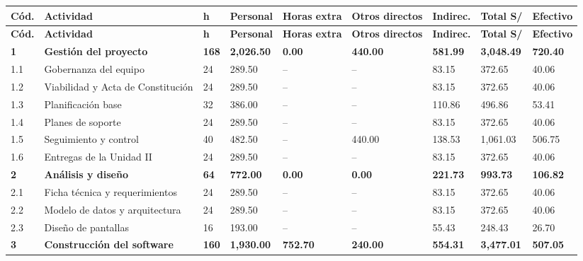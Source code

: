 \documentclass[11pt,a4paper]{article}
\begin{document}
\vspace{0.1cm}
{\footnotesize
\setlength{\tabcolsep}{3pt}
\begin{longtable}{@{}P{0.8cm} >{\raggedright\arraybackslash}p{3.65cm} Q{0.6cm} Q{1.45cm} Q{1.35cm} Q{1.45cm} Q{1.4cm} Q{1.65cm} Q{1.45cm}@{}}
\toprule
{}
\textbf{Cód.} & \textbf{Actividad} & \textbf{h} & \textbf{Personal} & \textbf{Horas extra} & \textbf{Otros directos} & \textbf{Indirec.} & \textbf{Total S/} & \textbf{Efectivo} \\
\midrule
\endfirsthead
\toprule
{}
\textbf{Cód.} & \textbf{Actividad} & \textbf{h} & \textbf{Personal} & \textbf{Horas extra} & \textbf{Otros directos} & \textbf{Indirec.} & \textbf{Total S/} & \textbf{Efectivo} \\
\midrule
\endhead
\bottomrule
\endfoot
{}
\textbf{1} & \textbf{\textcolor{Rama1}{Gestión del proyecto}} & \textbf{168} & \textbf{2,026.50} & \textbf{0.00} & \textbf{440.00} & \textbf{581.99} & \textbf{3,048.49} & \textbf{720.40} \\
1.1 & Gobernanza del equipo & 24 & 289.50 & -- & -- & 83.15 & 372.65 & 40.06 \\
1.2 & Viabilidad y Acta de Constitución & 24 & 289.50 & -- & -- & 83.15 & 372.65 & 40.06 \\
1.3 & Planificación base & 32 & 386.00 & -- & -- & 110.86 & 496.86 & 53.41 \\
1.4 & Planes de soporte & 24 & 289.50 & -- & -- & 83.15 & 372.65 & 40.06 \\
1.5 & Seguimiento y control & 40 & 482.50 & -- & 440.00 & 138.53 & 1,061.03 & 506.75 \\
1.6 & Entregas de la Unidad II & 24 & 289.50 & -- & -- & 83.15 & 372.65 & 40.06 \\
\textbf{2} & \textbf{\textcolor{Rama2}{Análisis y diseño}} & \textbf{64} & \textbf{772.00} & \textbf{0.00} & \textbf{0.00} & \textbf{221.73} & \textbf{993.73} & \textbf{106.82} \\
2.1 & Ficha técnica y requerimientos & 24 & 289.50 & -- & -- & 83.15 & 372.65 & 40.06 \\
2.2 & Modelo de datos y arquitectura & 24 & 289.50 & -- & -- & 83.15 & 372.65 & 40.06 \\
2.3 & Diseño de pantallas & 16 & 193.00 & -- & -- & 55.43 & 248.43 & 26.70 \\
\textbf{3} & \textbf{\textcolor{Rama3}{Construcción del software}} & \textbf{160} & \textbf{1,930.00} & \textbf{752.70} & \textbf{240.00} & \textbf{554.31} & \textbf{3,477.01} & \textbf{507.05} \\

\end{longtable}}
\end{document}
